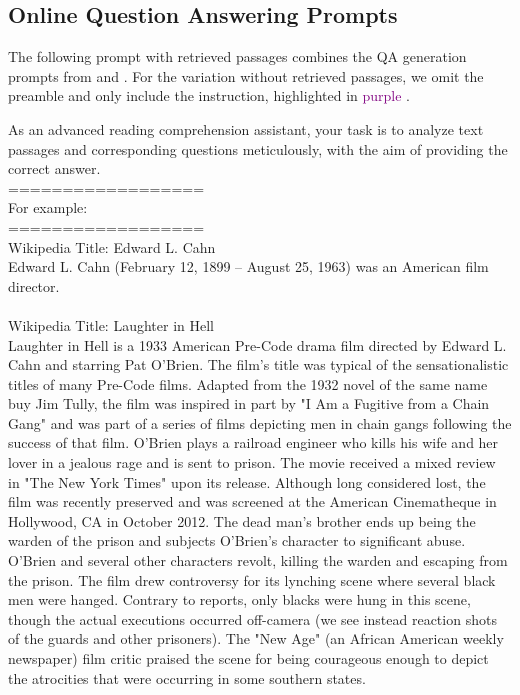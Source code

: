 \subsection{Online Question Answering Prompts}

The following prompt with retrieved passages combines the QA generation prompts from \citeauthor{Gutierrez2024} and \citeauthor{Wang2024}. For the variation without retrieved passages, we omit the preamble and only include the instruction, highlighted in \textcolor{purple}{purple} .

\begin{prompt}[title={Retrieved Passages with In-context Example}]
As an advanced reading comprehension assistant, your task is to analyze text passages and corresponding questions meticulously, with the aim of providing the correct answer. \\
==================\\
For example:\\
==================\\
Wikipedia Title: Edward L. Cahn \\
Edward L. Cahn (February 12, 1899 – August 25, 1963) was an American film director.\\
\\
Wikipedia Title: Laughter in Hell \\
Laughter in Hell is a 1933 American Pre-Code drama film directed by Edward L. Cahn and starring Pat O'Brien. The film's title was typical of the sensationalistic titles of many Pre-Code films. Adapted from the 1932 novel of the same name buy Jim Tully, the film was inspired in part by "I Am a Fugitive from a Chain Gang" and was part of a series of films depicting men in chain gangs following the success of that film. O'Brien plays a railroad engineer who kills his wife and her lover in a jealous rage and is sent to prison. The movie received a mixed review in "The New York Times" upon its release. Although long considered lost, the film was recently preserved and was screened at the American Cinematheque in Hollywood, CA in October 2012. The dead man's brother ends up being the warden of the prison and subjects O'Brien's character to significant abuse. O'Brien and several other characters revolt, killing the warden and escaping from the prison. The film drew controversy for its lynching scene where several black men were hanged. Contrary to reports, only blacks were hung in this scene, though the actual executions occurred off-camera (we see instead reaction shots of the guards and other prisoners). The "New Age" (an African American weekly newspaper) film critic praised the scene for being courageous enough to depict the atrocities that were occurring in some southern states. \\

\end{prompt}
